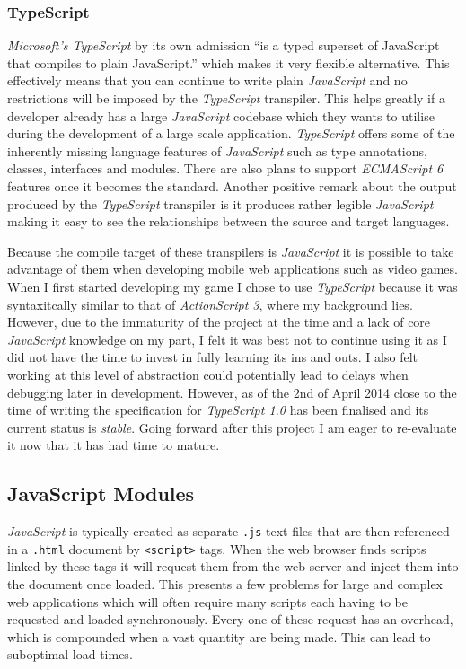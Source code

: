 \documentclass[final]{cmpreport}
\begin{document}
\subsubsection{TypeScript}
\textit{Microsoft's TypeScript} by its own admission ``is a typed superset of JavaScript that compiles to plain JavaScript.'' which makes it very flexible alternative. This effectively means that you can continue to write plain \textit{JavaScript} and no restrictions will be imposed by the \textit{TypeScript} transpiler. This helps greatly if a developer already has a large \textit{JavaScript} codebase which they wants to utilise during the development of a large scale application. \textit{TypeScript} offers some of the inherently missing language features of \textit{JavaScript} such as type annotations, classes, interfaces and modules. There are also plans to support \textit{ECMAScript 6} features once it becomes the standard. Another positive remark about the output produced by the \textit{TypeScript} transpiler is it produces rather legible \textit{JavaScript} making it easy to see the relationships between the source and target languages.

Because the compile target of these transpilers is \textit{JavaScript} it is possible to take advantage of them when developing mobile web applications such as video games. When I first started developing my game I chose to use \textit{TypeScript} because it was syntaxitcally similar to that of \textit{ActionScript 3}, where my background lies. However, due to the immaturity of the project at the time and a lack of core \textit{JavaScript} knowledge on my part, I felt it was best not to continue using it as I did not have the time to invest in fully learning its ins and outs. I also felt working at this level of abstraction could potentially lead to delays when debugging later in development. However, as of the 2nd of April 2014 close to the time of writing the specification for \textit{TypeScript 1.0} has been finalised and its current status is \textit{stable}. Going forward after this project I am eager to re-evaluate it now that it has had time to mature.

\subsection{JavaScript Modules}
\textit{JavaScript} is typically created as separate \texttt{.js} text files that are then referenced in a \texttt{.html} document by \texttt{<script>} tags. When the web browser finds scripts linked by these tags it will request them from the web server and inject them into the document once loaded. This presents a few problems for large and complex web applications which will often require many scripts each having to be requested and loaded synchronously. Every one of these request has an overhead, which is compounded when a vast quantity are being made. This can lead to suboptimal load times.
\end{document}
